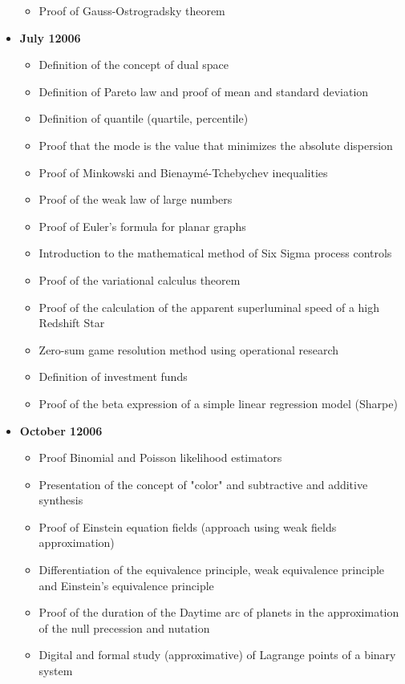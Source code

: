 \begin{itemize}
\begin{itemize}[noitemsep]
			\item Proof of Gauss-Ostrogradsky theorem 
		\end{itemize}
	\item \textbf{July 12006}
		\begin{itemize}[noitemsep]
			\item Definition of the concept of dual space
			\item Definition of Pareto law and proof of mean and standard deviation
			\item Definition of quantile (quartile, percentile)
			\item Proof that the mode is the value that minimizes the absolute dispersion
			\item Proof of Minkowski and Bienaymé-Tchebychev inequalities
			\item Proof of the weak law of large numbers 
			\item Proof of Euler's formula for planar graphs
			\item Introduction to the mathematical method of Six Sigma process controls
			\item Proof of the variational calculus theorem
			\item Proof of the calculation of the apparent superluminal speed of a high Redshift Star
			\item Zero-sum game resolution method using operational research
			\item Definition of investment funds
			\item Proof of the beta expression of a simple linear regression model (Sharpe)				
		\end{itemize}
	\item \textbf{October 12006}
		\begin{itemize}[noitemsep]
			\item Proof Binomial and Poisson likelihood estimators
			\item Presentation of the concept of "color" and subtractive and additive synthesis
			\item Proof of Einstein equation fields (approach using weak fields approximation)
			\item Differentiation of the equivalence principle, weak equivalence principle and Einstein's equivalence principle
			\item Proof of the duration of the Daytime arc of planets in the approximation of the null precession and nutation
			\item Digital and formal study (approximative) of Lagrange points of a binary system

\end{itemize}
\end{itemize}
